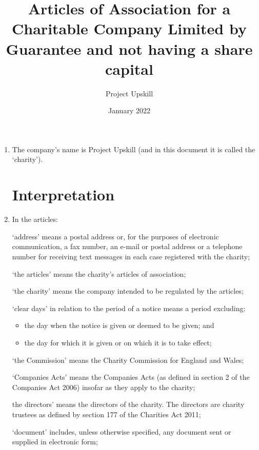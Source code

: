 \documentclass{article}
\title{Articles of Association for a Charitable Company Limited by Guarantee and not having a share capital}
\author{Project Upskill}
\date{January 2022}
\begin{document}
\maketitle
\tableofcontents
\newpage
\begin{enumerate}[label=\arabic*]
    \section{Articles of Association of Project Upskill}
    \item The company's name is Project Upskill (and in this document it is called the ‘charity’).
    
    \section{Interpretation}
    \item In the articles:
    
    ‘address’ means a postal address or, for the purposes of electronic
    communication, a fax number, an e-mail or postal address or a
    telephone number for receiving text messages in each case registered
    with the charity;
    
    ‘the articles’ means the charity’s articles of association;
    
    ‘the charity’ means the company intended to be regulated by
    the articles;
    
    ‘clear days’ in relation to the period of a notice means a
    period excluding:
    \begin{itemize}
        \item the day when the notice is given or deemed to be given; and
        \item the day for which it is given or on which it is to take effect;
    \end{itemize}
    
    ‘the Commission’ means the Charity Commission for England and Wales;
    
    ‘Companies Acts’ means the Companies Acts (as defined in section 2 of
    the Companies Act 2006) insofar as they apply to the charity;
    
    the directors’ means the directors of the charity. The directors are
    charity trustees as defined by section 177 of the Charities Act 2011;
    
    ‘document’ includes, unless otherwise specified, any document sent or
    supplied in electronic form;
    

\end{enumerate}
\end{document}
